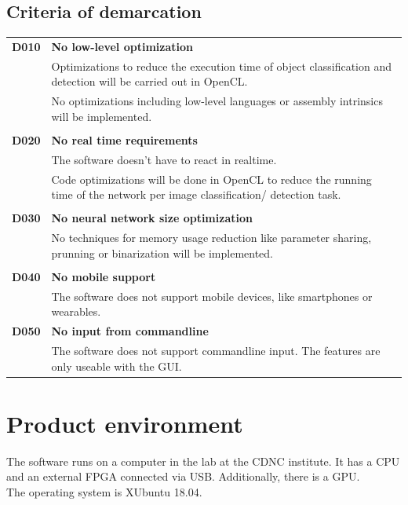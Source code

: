 \documentclass[parskip=full]{scrartcl}
\begin{document}
\subsection{Criteria of demarcation}
\begin{tabular}{p{2cm}p{12cm}}
\textbf{D010} & \textbf{No low-level optimization}\\
& Optimizations to reduce the execution time of object classification and detection will  be carried out in OpenCL.\\
& No optimizations including low-level languages or assembly intrinsics will be implemented.\\
&\\
\textbf{D020} & \textbf{No real time requirements}\\
& The software doesn't have to react in realtime. \\
& Code optimizations will be done in OpenCL to reduce the running time of the network per image classification/ detection task.\\
&\\
\textbf{D030} & \textbf{No neural network size optimization}\\
& No techniques for memory usage reduction like parameter sharing, prunning or binarization will be implemented.\\
&\\
\textbf{D040} & \textbf{No mobile support}\\
& The software does not support mobile devices, like smartphones or wearables.\\
\textbf{D050} & \textbf{No input from commandline}\\
& The software does not support commandline input. The features are only useable with the GUI.
\end{tabular}


\section{Product environment}
The software runs on a computer in the lab at the CDNC institute. It has a CPU and an external FPGA connected via USB. Additionally, there is a GPU.\\ The operating system is XUbuntu 18.04.
\end{document}
